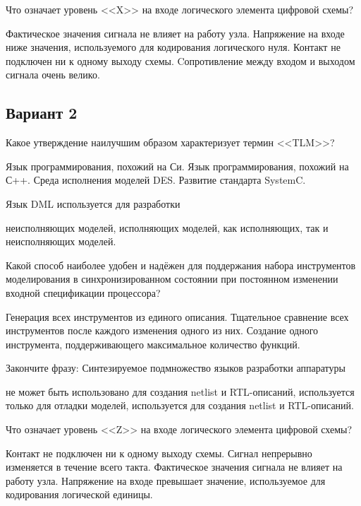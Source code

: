 \begin{questions}
\question[3] Что означает уровень <<X>> на входе логического элемента цифровой схемы?
\begin{choices}
    \correctchoice Фактическое значения сигнала не влияет на работу узла.
	\choice Напряжение на входе ниже значения, используемого для кодирования логического нуля.
    \choice Контакт не подключен ни к одному выходу схемы.
	\choice Cопротивление между входом и выходом сигнала очень велико.
\end{choices}

\end{questions}

\subsection*{Вариант 2}

\begin{questions}

\question[3] Какое утверждение наилучшим образом характеризует термин <<TLM>>?
\begin{choices}
    \choice Язык программирования, похожий на Си.
    \choice Язык программирования, похожий на С++.
    \choice Среда исполнения моделей DES.
    \correctchoice Развитие стандарта SystemC.
\end{choices}

\question[3] Язык DML используется для разработки
\begin{choices}
    \correctchoice неисполняющих моделей,
    \choice исполняющих моделей,
    \choice как исполняющих, так и неисполняющих моделей.
\end{choices}

\question[3] Какой способ наиболее удобен и надёжен для поддержания набора инструментов моделирования в синхронизированном состоянии при постоянном изменении входной спецификации процессора?
\begin{choices}
    \correctchoice Генерация всех инструментов из единого описания.
    \choice Тщательное сравнение всех инструментов после каждого изменения одного из них.
    \choice Создание одного инструмента, поддерживающего максимальное количество функций.
\end{choices}

\question[3] Закончите фразу: Синтезируемое подмножество языков разработки аппаратуры
\begin{choices}
\choice не может быть использовано для создания netlist и RTL-описаний,
\choice используется только для отладки моделей,
\correctchoice  используется для создания netlist и RTL-описаний.
\end{choices}

\question[3] Что означает уровень <<Z>> на входе логического элемента цифровой схемы?
\begin{choices}
    \correctchoice Контакт не подключен ни к одному выходу схемы.
	\choice Сигнал непрерывно изменяется в течение всего такта.
    \choice Фактическое значения сигнала не влияет на работу узла.
	\choice Напряжение на входе превышает значение, используемое для кодирования логической единицы.
\end{choices}

\end{questions}

